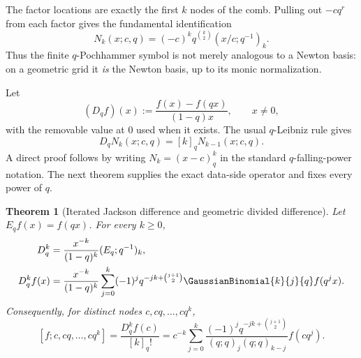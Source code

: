 \documentclass[11pt,oneside]{book}
\numberwithin{equation}{chapter}
\newtheorem{theorem}{Theorem}[chapter]
\theoremstyle{definition}
\theoremstyle{remark}
\begin{document}
The factor locations are exactly the first $k$ nodes of the comb.  Pulling
out $-cq^r$ from each factor gives the fundamental identification
\begin{equation}
 \boxed{
 N_k(x;c,q)=(-c)^kq^{\binom k2}(x/c;q^{-1})_k.}
 \label{eq:newton-pochhammer}
\end{equation}
Thus the finite $q$-Pochhammer symbol is not merely analogous to a Newton
basis: on a geometric grid it \emph{is} the Newton basis, up to its monic
normalization.

Let
\begin{equation}
 (D_qf)(x):=\frac{f(x)-f(qx)}{(1-q)x},
 \qquad x\ne0,
 \label{eq:Dq}
\end{equation}
with the removable value at $0$ used when it exists.  The usual $q$-Leibniz
rule gives
\begin{equation}
 D_qN_k(x;c,q)=[k]_qN_{k-1}(x;c,q).
 \label{eq:Dq-newton}
\end{equation}
A direct proof follows by writing $N_k=(x-c)_{q}^{k}$ in the standard
$q$-falling-power notation.  The next theorem supplies the exact data-side
operator and fixes every power of $q$.

\begin{theorem}[Iterated Jackson difference and geometric divided difference]
\label{thm:Dq-divided-difference}
Let $E_qf(x)=f(qx)$.  For every $k\ge0$,
\begin{align}
 D_q^k
 &=\frac{x^{-k}}{(1-q)^k}(E_q;q^{-1})_k,
 \label{eq:Dq-operator-factor}\\
 D_q^kf(x)
 &=\frac{x^{-k}}{(1-q)^k}
   \sum_{j=0}^k(-1)^j
   q^{-jk+\binom{j+1}{2}}\GaussianBinomial{k}{j}{q}f(q^jx).
 \label{eq:Dq-explicit}
\end{align}
Consequently, for distinct nodes $c,cq,\ldots,cq^k$,
\begin{equation}
 \boxed{
 [f;c,cq,\ldots,cq^k]
 =\frac{D_q^kf(c)}{[k]_q!}
 =c^{-k}\sum_{j=0}^k
 \frac{(-1)^jq^{-jk+\binom{j+1}{2}}}
 {(q;q)_j(q;q)_{k-j}}f(cq^j).}
 \label{eq:geometric-divided-difference}
\end{equation}
\end{theorem}
\end{document}
